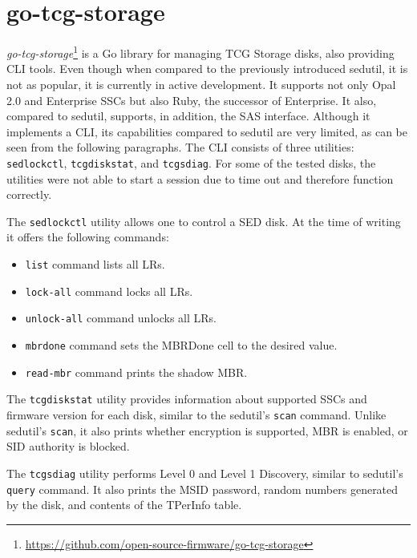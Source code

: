 
\section{go-tcg-storage}

\emph{go-tcg-storage}\footnote{\url{https://github.com/open-source-firmware/go-tcg-storage}} is a Go library for managing TCG Storage disks, also providing CLI tools. Even though when compared to the previously introduced sedutil, it is not as popular, it is currently in active development. It supports not only Opal 2.0 and Enterprise SSCs but also Ruby, the successor of Enterprise. It also, compared to sedutil, supports, in addition, the SAS interface.
Although it implements a CLI, its capabilities compared to sedutil are very limited, as can be seen from the following paragraphs. The CLI consists of three utilities: \verb|sedlockctl|, \verb|tcgdiskstat|, and \verb|tcgsdiag|. 
For some of the tested disks, the utilities were not able to start a session due to time out and therefore function correctly.


The \verb|sedlockctl| utility allows one to control a SED disk. At the time of writing it offers the following commands: \begin{itemize}
 \item \verb|list| command lists all LRs.
 \item \verb|lock-all| command locks all LRs.
 \item \verb|unlock-all| command unlocks all LRs.
 \item \verb|mbrdone| command sets the MBRDone cell to the desired value.
 \item \verb|read-mbr| command prints the shadow MBR.
\end{itemize}

The \verb|tcgdiskstat| utility provides information about supported SSCs and firmware version for each disk, similar to the sedutil's \verb|scan| command. Unlike sedutil's \verb|scan|, it also prints whether encryption is supported, MBR is enabled, or SID authority is blocked.

The \verb|tcgsdiag| utility performs Level 0 and Level 1 Discovery, similar to sedutil's \verb|query| command. It also prints the MSID password, random numbers generated by the disk, and contents of the TPerInfo table. 


